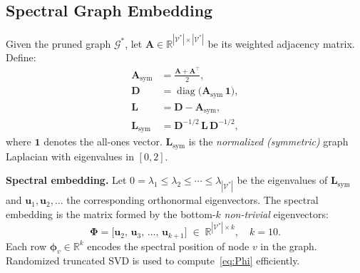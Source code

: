 \subsection{Spectral Graph Embedding}
\label{subsec:spectral}

\begin{definition}
\label{def:laplacian}
Given the pruned graph $\mathcal{G}^{*}$, let
$\mathbf{A}\in\mathbb{R}^{|\mathcal{V}^{*}|\times|\mathcal{V}^{*}|}$ be its
weighted adjacency matrix.  Define:
\begin{align}
  \mathbf{A}_{\mathrm{sym}}
    &= \frac{\mathbf{A} + \mathbf{A}^{\!\top}}{2},
    \label{eq:Asym} \\[4pt]
  \mathbf{D}
    &= \operatorname{diag}\!\bigl(\mathbf{A}_{\mathrm{sym}}\,\mathbf{1}\bigr),
    \label{eq:degree} \\[4pt]
  \mathbf{L}
    &= \mathbf{D} - \mathbf{A}_{\mathrm{sym}},
    \label{eq:laplacian} \\[4pt]
  \mathbf{L}_{\mathrm{sym}}
    &= \mathbf{D}^{-1/2}\,\mathbf{L}\,\mathbf{D}^{-1/2},
    \label{eq:Lsym}
\end{align}
where $\mathbf{1}$ denotes the all-ones vector.
$\mathbf{L}_{\mathrm{sym}}$ is the \emph{normalized (symmetric)} graph
Laplacian with eigenvalues in $[0,2]$.
\end{definition}

\noindent\textbf{Spectral embedding.}
Let $0 = \lambda_1 \leq \lambda_2 \leq \cdots \leq \lambda_{|\mathcal{V}^{*}|}$
be the eigenvalues of $\mathbf{L}_{\mathrm{sym}}$ and
$\mathbf{u}_1, \mathbf{u}_2, \ldots$ the corresponding orthonormal
eigenvectors.
The spectral embedding is the matrix formed by the bottom-$k$
\emph{non-trivial} eigenvectors:
\begin{equation}
  \boldsymbol{\Phi}
    = \bigl[\mathbf{u}_{2},\,\mathbf{u}_{3},\,\ldots,\,\mathbf{u}_{k+1}\bigr]
    \;\in\; \mathbb{R}^{|\mathcal{V}^{*}|\times k},
  \quad k = 10.
  \label{eq:Phi}
\end{equation}
Each row $\boldsymbol{\phi}_{v}\in\mathbb{R}^{k}$ encodes the spectral
position of node $v$ in the graph.
Randomized truncated SVD is used to compute~\eqref{eq:Phi} efficiently.

